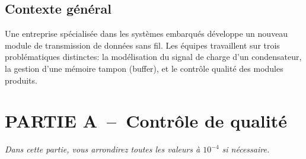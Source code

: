 \subsection*{Contexte général}

Une entreprise spécialisée dans les systèmes embarqués développe un nouveau module de transmission de données sans fil. Les équipes travaillent sur trois problématiques distinctes: la modélisation du signal de charge d'un condensateur, la gestion d'une mémoire tampon (buffer), et le contrôle qualité des modules produits.

\section*{PARTIE A~--~Contrôle de qualité}

\medskip

\emph{Dans cette partie, vous arrondirez toutes les valeurs à $10^{-4}$ si nécessaire.}

\medskip

